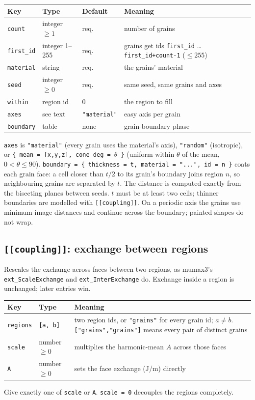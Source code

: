 \documentclass[10pt,a4paper]{article}
\newcommand{\code}[1]{\texttt{#1}}
\begin{document}
\begin{tabularx}{\textwidth}{@{}l l l Y@{}}
\toprule
Key & Type & Default & Meaning \\
\midrule
\code{count} & integer $\geq1$ & req. & number of grains \\
\code{first\_id} & integer 1--255 & req. & grains get ids \code{first\_id} \ldots{} \code{first\_id+count-1} ($\leq 255$) \\
\code{material} & string & req. & the grains' material \\
\code{seed} & integer $\geq0$ & req. & same seed, same grains and axes \\
\code{within} & region id & 0 & the region to fill \\
\code{axes} & see text & \code{"material"} & easy axis per grain \\
\code{boundary} & table & none & grain-boundary phase \\
\bottomrule
\end{tabularx}

\code{axes} is \code{"material"} (every grain uses the material's axis), \code{"random"} (isotropic), or
\code{\{ mean = [x,y,z], cone\_deg = $\theta$ \}} (uniform within $\theta$ of the mean, $0<\theta\leq90$).
\code{boundary = \{ thickness = t, material = "...", id = n \}} coats each grain face: a cell closer than $t/2$ to its
grain's boundary joins region $n$, so neighbouring grains are separated by $t$. The distance is computed exactly from the
bisecting planes between seeds. $t$ must be at least two cells; thinner boundaries are modelled with \code{[[coupling]]}.
On a periodic axis the grains use minimum-image distances and continue across the boundary; painted shapes do not wrap.

\subsection{\code{[[coupling]]}: exchange between regions}
{\sloppy Rescales the exchange across faces between two regions, as mumax3's \code{ext\_ScaleExchange} and
\code{ext\_InterExchange} do. Exchange inside a region is unchanged; later entries win.\par}

\begin{tabularx}{\textwidth}{@{}l l Y@{}}
\toprule
Key & Type & Meaning \\
\midrule
\code{regions} & \code{[a, b]} & two region ids, or \code{"grains"} for every grain id; $a\neq b$.
  \code{["grains","grains"]} means every pair of distinct grains \\
\code{scale} & number $\geq0$ & multiplies the harmonic-mean $A$ across those faces \\
\code{A} & number $\geq0$ & sets the face exchange (J/m) directly \\
\bottomrule
\end{tabularx}
Give exactly one of \code{scale} or \code{A}. \code{scale = 0} decouples the regions completely.
\end{document}
